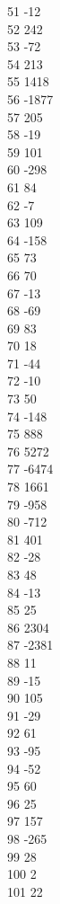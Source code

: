 { 51	-12 \\
 52	242 \\
 53	-72 \\
 54	213 \\
 55	1418 \\
 56	-1877 \\
 57	205 \\
 58	-19 \\
 59	101 \\
 60	-298 \\
 61	84 \\
 62	-7 \\
 63	109 \\
 64	-158 \\
 65	73 \\
 66	70 \\
 67	-13 \\
 68	-69 \\
 69	83 \\
 70	18 \\
 71	-44 \\
 72	-10 \\
 73	50 \\
 74	-148 \\
 75	888 \\
 76	5272 \\
 77	-6474 \\
 78	1661 \\
 79	-958 \\
 80	-712 \\
 81	401 \\
 82	-28 \\
 83	48 \\
 84	-13 \\
 85	25 \\
 86	2304 \\
 87	-2381 \\
 88	11 \\
 89	-15 \\
 90	105 \\
 91	-29 \\
 92	61 \\
 93	-95 \\
 94	-52 \\
 95	60 \\
 96	25 \\
 97	157 \\
 98	-265 \\
 99	28 \\
 100	2 \\
 101	22 \\
}
